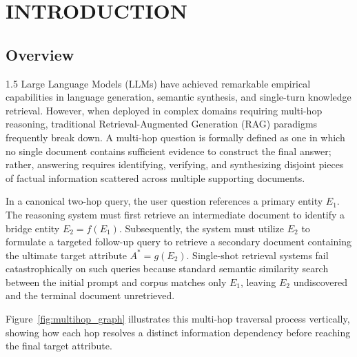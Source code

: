 \documentclass[12pt,a4paper]{report}
\begin{document}
\chapter{INTRODUCTION}

\section{Overview}
\begin{spacing}{1.5}
Large Language Models (LLMs) have achieved remarkable empirical capabilities in language generation, semantic synthesis, and single-turn knowledge retrieval. However, when deployed in complex domains requiring multi-hop reasoning, traditional Retrieval-Augmented Generation (RAG) paradigms frequently break down. A multi-hop question is formally defined as one in which no single document contains sufficient evidence to construct the final answer; rather, answering requires identifying, verifying, and synthesizing disjoint pieces of factual information scattered across multiple supporting documents.

In a canonical two-hop query, the user question references a primary entity $E_1$. The reasoning system must first retrieve an intermediate document to identify a bridge entity $E_2 = f(E_1)$. Subsequently, the system must utilize $E_2$ to formulate a targeted follow-up query to retrieve a secondary document containing the ultimate target attribute $A^* = g(E_2)$. Single-shot retrieval systems fail catastrophically on such queries because standard semantic similarity search between the initial prompt and corpus matches only $E_1$, leaving $E_2$ undiscovered and the terminal document unretrieved.

Figure~\ref{fig:multihop_graph} illustrates this multi-hop traversal process vertically, showing how each hop resolves a distinct information dependency before reaching the final target attribute.

\begin{figure}[!htbp]
\centering
{}
\end{figure}
\end{spacing}
\end{document}
